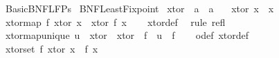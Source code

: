 %
\begin{isabellebody}%
%
%
\isadelimtheory
\isanewline
\isanewline
%
\endisadelimtheory
%
\isatagtheory
{}\isamarkupfalse%
\ Basic{\isacharunderscore}{\kern0pt}BNF{\isacharunderscore}{\kern0pt}LFPs\isanewline
{}\ BNF{\isacharunderscore}{\kern0pt}Least{\isacharunderscore}{\kern0pt}Fixpoint\isanewline
{}%
\endisatagtheory
{\isafoldtheory}%
%
\isadelimtheory
\isanewline
%
\endisadelimtheory
\isanewline
{}\isamarkupfalse%
\ xtor\ {\isacharcolon}{\kern0pt}{\isacharcolon}{\kern0pt}\ {\isachardoublequoteopen}{\isacharprime}{\kern0pt}a\ {\isasymRightarrow}\ {\isacharprime}{\kern0pt}a{\isachardoublequoteclose}\ \isanewline
\ \ {\isachardoublequoteopen}xtor\ x\ {\isacharequal}{\kern0pt}\ x{\isachardoublequoteclose}\isanewline
\isanewline
{}\isamarkupfalse%
\ xtor{\isacharunderscore}{\kern0pt}map{\isacharcolon}{\kern0pt}\ {\isachardoublequoteopen}f\ {\isacharparenleft}{\kern0pt}xtor\ x{\isacharparenright}{\kern0pt}\ {\isacharequal}{\kern0pt}\ xtor\ {\isacharparenleft}{\kern0pt}f\ x{\isacharparenright}{\kern0pt}{\isachardoublequoteclose}\isanewline
%
\isadelimproof
\ \ %
\endisadelimproof
%
\isatagproof
{}\isamarkupfalse%
\ xtor{\isacharunderscore}{\kern0pt}def\ \isamarkupfalse%
\ {\isacharparenleft}{\kern0pt}rule\ refl{\isacharparenright}{\kern0pt}%
\endisatagproof
{\isafoldproof}%
%
\isadelimproof
\isanewline
%
\endisadelimproof
\isanewline
{}\isamarkupfalse%
\ xtor{\isacharunderscore}{\kern0pt}map{\isacharunderscore}{\kern0pt}unique{\isacharcolon}{\kern0pt}\ {\isachardoublequoteopen}u\ {\isasymcirc}\ xtor\ {\isacharequal}{\kern0pt}\ xtor\ {\isasymcirc}\ f\ {\isasymLongrightarrow}\ u\ {\isacharequal}{\kern0pt}\ f{\isachardoublequoteclose}\isanewline
%
\isadelimproof
\ \ %
\endisadelimproof
%
\isatagproof
{}\isamarkupfalse%
\ o{\isacharunderscore}{\kern0pt}def\ xtor{\isacharunderscore}{\kern0pt}def\ \isacommand{{\isachardot}{\kern0pt}}\isamarkupfalse%
%
\endisatagproof
{\isafoldproof}%
%
\isadelimproof
\isanewline
%
\endisadelimproof
\isanewline
{}\isamarkupfalse%
\ xtor{\isacharunderscore}{\kern0pt}set{\isacharcolon}{\kern0pt}\ {\isachardoublequoteopen}f\ {\isacharparenleft}{\kern0pt}xtor\ x{\isacharparenright}{\kern0pt}\ {\isacharequal}{\kern0pt}\ f\ x{\isachardoublequoteclose}\isanewline
%
\isadelimproof
\ \ %
\endisadelimproof
%
\isatagproof

\end{isabellebody}
